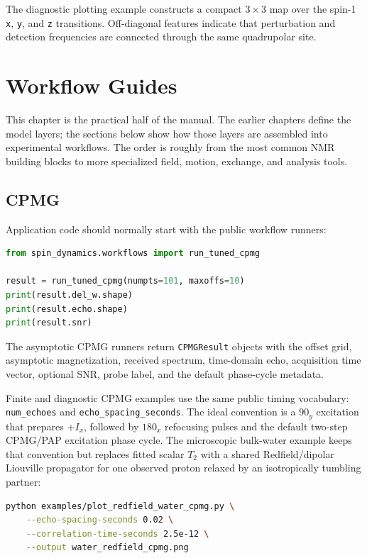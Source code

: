 \documentclass[11pt,oneside]{report}
\newcommand{\code}[1]{\texttt{#1}}
\begin{document}
The diagnostic plotting example constructs a compact \(3\times3\) map over the
spin-1 \code{x}, \code{y}, and \code{z} transitions. Off-diagonal features
indicate that perturbation and detection frequencies are connected through the
same quadrupolar site.

\chapter{Workflow Guides}
\label{chap:workflows}

This chapter is the practical half of the manual. The earlier chapters define
the model layers; the sections below show how those layers are assembled into
experimental workflows. The order is roughly from the most common NMR building
blocks to more specialized field, motion, exchange, and analysis tools.

\section{CPMG}

Application code should normally start with the public workflow runners:

\begin{lstlisting}[language=Python]
from spin_dynamics.workflows import run_tuned_cpmg

result = run_tuned_cpmg(numpts=101, maxoffs=10)
print(result.del_w.shape)
print(result.echo.shape)
print(result.snr)
\end{lstlisting}

The asymptotic CPMG runners return \code{CPMGResult} objects with the offset
grid, asymptotic magnetization, received spectrum, time-domain echo, acquisition
time vector, optional SNR, probe label, and the default phase-cycle metadata.

Finite and diagnostic CPMG examples use the same public timing vocabulary:
\code{num\_echoes} and \code{echo\_spacing\_seconds}. The ideal convention is a
\(90_y\) excitation that prepares \(+I_x\), followed by \(180_x\) refocusing
pulses and the default two-step CPMG/PAP excitation phase cycle. The microscopic
bulk-water example keeps that convention but replaces fitted scalar \(T_2\) with
a shared Redfield/dipolar Liouville propagator for one observed proton relaxed
by an isotropically tumbling partner:

\begin{lstlisting}[language=bash]
python examples/plot_redfield_water_cpmg.py \
    --echo-spacing-seconds 0.02 \
    --correlation-time-seconds 2.5e-12 \
    --output water_redfield_cpmg.png
\end{lstlisting}
\end{document}

